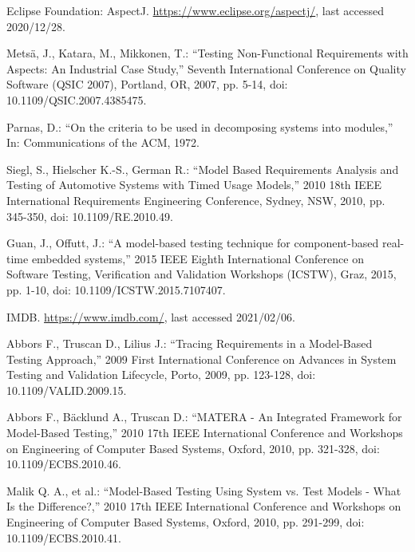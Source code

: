 \documentclass[a4paper,10pt, bibliography=totocnumbered]{scrreprt}
\begin{document}
\begin{thebibliography}{9}
 Eclipse Foundation: AspectJ.
\url{https://www.eclipse.org/aspectj/},  last accessed 2020/12/28.

 Metsä, J., Katara, M., Mikkonen, T.: \enquote{Testing Non-Functional Requirements with Aspects: An Industrial Case Study,} Seventh International Conference on Quality Software (QSIC 2007), Portland, OR, 2007, pp. 5-14, doi: 10.1109/QSIC.2007.4385475.

 Parnas, D.: \enquote{On the criteria to be used in decomposing systems into modules,}
In: Communications of the ACM, 1972.



 Siegl, S., Hielscher K.-S., German R.: \enquote{Model Based Requirements Analysis and Testing of Automotive Systems with Timed Usage Models,} 2010 18th IEEE International Requirements Engineering Conference, Sydney, NSW, 2010, pp. 345-350, doi: 10.1109/RE.2010.49.

 Guan, J., Offutt, J.: \enquote{A model-based testing technique for component-based real-time embedded systems,} 2015 IEEE Eighth International Conference on Software Testing, Verification and Validation Workshops (ICSTW), Graz, 2015, pp. 1-10, doi: 10.1109/ICSTW.2015.7107407.

 IMDB. \url{https://www.imdb.com/}, last accessed 2021/02/06.




 Abbors F., Truscan D., Lilius J.: \enquote{Tracing Requirements in a Model-Based Testing Approach,} 2009 First International Conference on Advances in System Testing and Validation Lifecycle, Porto, 2009, pp. 123-128, doi: 10.1109/VALID.2009.15.

 Abbors F., Bäcklund A., Truscan D.: \enquote{MATERA - An Integrated Framework for Model-Based Testing,} 2010 17th IEEE International Conference and Workshops on Engineering of Computer Based Systems, Oxford, 2010, pp. 321-328, doi: 10.1109/ECBS.2010.46.

 Malik Q. A., et al.: \enquote{Model-Based Testing Using System vs. Test Models - What Is the Difference?,} 2010 17th IEEE International Conference and Workshops on Engineering of Computer Based Systems, Oxford, 2010, pp. 291-299, doi: 10.1109/ECBS.2010.41.


\end{thebibliography}
\end{document}
